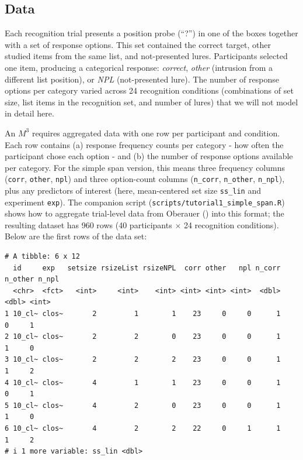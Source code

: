 \documentclass[
  man,
  floatsintext,
  longtable,
  nolmodern,
  notxfonts,
  notimes,
  colorlinks=true,linkcolor=blue,citecolor=blue,urlcolor=blue]{apa7}
\begin{document}
\subsection{Data}\label{data}

Each recognition trial presents a position probe (``?'') in one of the
boxes together with a set of response options. This set contained the
correct target, other studied items from the same list, and
not-presented lures. Participants selected one item, producing a
categorical response: \emph{correct}, \emph{other} (intrusion from a
different list position), or \emph{NPL} (not-presented lure). The number
of response options per category varied across 24 recognition conditions
(combinations of set size, list items in the recognition set, and number
of lures) that we will not model in detail here.

An \(M^3\) requires aggregated data with one row per participant and
condition. Each row contains (a) response frequency counts per category
- how often the participant chose each option - and (b) the number of
response options available per category. For the simple span version,
this means three frequency columns (\texttt{corr}, \texttt{other},
\texttt{npl}) and three option-count columns (\texttt{n\_corr},
\texttt{n\_other}, \texttt{n\_npl}), plus any predictors of interest
(here, mean-centered set size \texttt{ss\_lin} and experiment
\texttt{exp}). The companion script
(\texttt{scripts/tutorial1\_simple\_span.R}) shows how to aggregate
trial-level data from Oberauer
() into this format; the
resulting dataset has 960 rows (40 participants \(\times\) 24
recognition conditions). Below are the first rows of the data set:

\begin{verbatim}
# A tibble: 6 x 12
  id     exp   setsize rsizeList rsizeNPL  corr other   npl n_corr n_other n_npl
  <chr>  <fct>   <int>     <int>    <int> <int> <int> <int>  <dbl>   <dbl> <int>
1 10_cl~ clos~       2         1        1    23     0     0      1       0     1
2 10_cl~ clos~       2         2        0    23     0     0      1       1     0
3 10_cl~ clos~       2         2        2    23     0     0      1       1     2
4 10_cl~ clos~       4         1        1    23     0     0      1       0     1
5 10_cl~ clos~       4         2        0    23     0     0      1       1     0
6 10_cl~ clos~       4         2        2    22     0     1      1       1     2
# i 1 more variable: ss_lin <dbl>
\end{verbatim}
\end{document}
